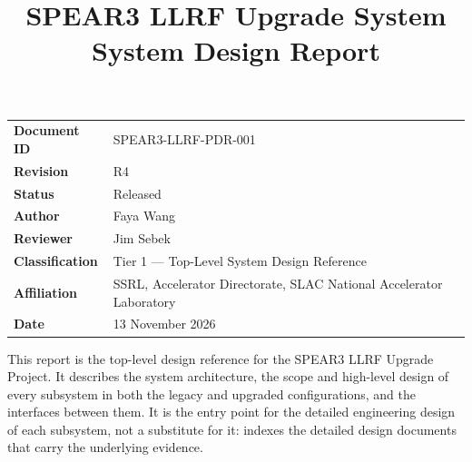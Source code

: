 \documentclass[letterpaper,11pt]{article}
\title{\vspace{-1.4cm}\bfseries SPEAR3 LLRF Upgrade System\\[2mm]
       \Large System Design Report}
\author{}
\date{}
\begin{document}
\maketitle
\thispagestyle{plain}

\begin{center}
\begin{minipage}{0.86\linewidth}\small
\begin{tabular}{@{}ll@{}}
\textbf{Document ID}       & SPEAR3-LLRF-PDR-001 \\
\textbf{Revision}  & R4 \\
\textbf{Status}            & Released \\
\textbf{Author}           & Faya Wang \\
\textbf{Reviewer}         & Jim Sebek \\
\textbf{Classification}    & Tier 1 --- Top-Level System Design Reference \\
\textbf{Affiliation}        & SSRL, Accelerator Directorate, SLAC National Accelerator Laboratory \\
\textbf{Date}             & 13 November 2026 \\
\end{tabular}
\end{minipage}
\end{center}

\vspace{4mm}
\begin{keynote}
This report is the top-level design reference for the SPEAR3 LLRF Upgrade
Project.  It describes the system architecture, the scope and high-level design
of every subsystem in both the legacy and upgraded configurations, and the
interfaces between them.  It is the entry point for the detailed engineering
design of each subsystem, not a substitute for it:
 indexes the detailed design documents that
carry the underlying evidence.
\end{keynote}

\clearpage
\tableofcontents
\clearpage
\listoffigures
\clearpage


\end{document}
